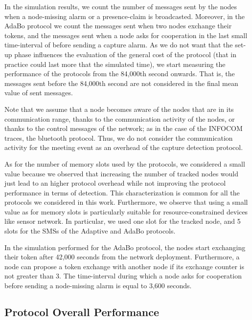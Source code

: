 \documentclass{IEEEconf}
\begin{document}
In the simulation results, we count the number of messages sent by the nodes when a node-missing alarm or a presence-claim is broadcasted. Moreover, in the AdaBo protocol we count the messages sent when two nodes exchange their tokens, and the messages sent when a node asks for cooperation in the last small time-interval  of  before sending a capture alarm.
As we do not want that the set-up phase influences the evaluation of the general cost of the protocol (that in practice could last more that the simulated time), we start measuring the performance of the protocols from the 84,000th second onwards. That is, the messages sent before the 84,000th second are not considered in the final mean value of sent messages.

Note that we assume that a node becomes aware of the nodes that are in its communication range, thanks to the communication activity of the nodes, or thanks to the control messages of the network; as in the case of the INFOCOM traces, the bluetooth protocol. Thus, we do not consider  the communication activity for the meeting event as an overhead of the capture detection protocol.

As for the number of memory slots used by the protocols, we considered a small value because we observed that increasing the number of tracked nodes would just lead to an higher protocol overhead while not improving the protocol performance in terms of detection. This characterization is common for all the protocols we considered in this work. Furthermore, we observe that using a small value as for memory slots is particularly suitable for resource-constrained devices like sensor network.
In particular, we used one slot for the tracked node, and 5 slots for the SMSs of the Adaptive and AdaBo protocols.


In the simulation performed for the AdaBo protocol, the nodes start exchanging their token after 42,000 seconds from the network deployment. Furthermore, a node can propose a token exchange with another node if its exchange counter is not greater than 3. The time-interval  during which a node asks for cooperation before sending a node-missing alarm is equal to 3,600 seconds.







\subsection{Protocol Overall Performance}
\label{OVperformances}
\end{document}

